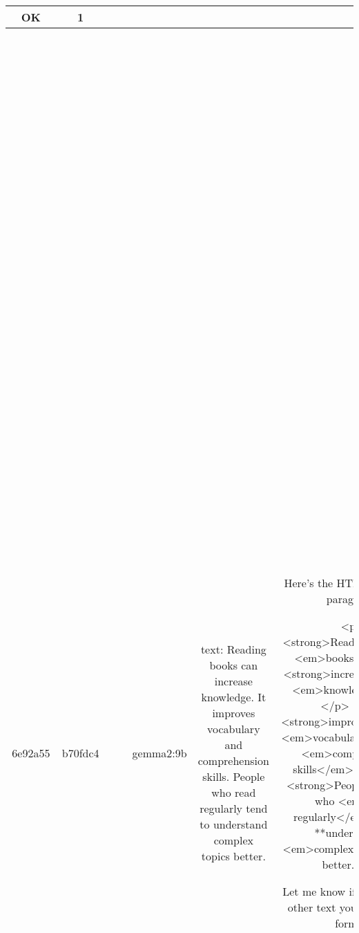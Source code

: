 \begin{table}[h!]
\begin{tabular}{|c|c|c|c|c|c|c|c|c|c|}
OK & 1\\
\hline
6e92a55 & b70fdc4 &  &  & gemma2:9b & text: Reading books can increase knowledge. It improves vocabulary and comprehension skills. People who read regularly tend to understand complex topics better. & Here's the HTML formatted paragraph:

<p><strong>Reading</strong> <em>books</em> can <strong>increase</strong> <em>knowledge</em>.</p>
<p>It <strong>improves</strong> <em>vocabulary</em> and <em>comprehension skills</em>.</p>
<p><strong>People</strong> who <em>read regularly</em> tend to **understand** <em>complex topics</em> better.</p>


Let me know if you have any other text you'd like me to format! & err & The chatbot output consists of three sentences, each wrapped in its own `<p>` tag, which complies with the requirement of having at least three `<p>` tags. 

1. The first `<p>` tag contains a `<strong>` tag emphasizing the word "Reading" and two `<em>` tags emphasizing "books" and "knowledge", which follows the instruction to use one `<strong>` tag and multiple `<em>` tags within each sentence.

2. The second `<p>` tag has a `<strong>` tag emphasizing "improves" and `<em>` tags for "vocabulary" and "comprehension skills."

3. The third `<p>` tag has a `<strong>` tag around "People," and although it intends to emphasize text with asterisks around "understand," it should have used a `<strong>` tag as required. It also contains `<em>` tags for "read regularly" and "complex topics."

The third sentence improperly uses asterisks for emphasis instead of an HTML `<strong>` tag, which breaches the requirement to use a `<strong>` tag. This discrepancy leads to non-compliance with the description provided.

ERR & 1\\
\hline
192d4b7 & b70fdc4 &  &  & gemma2:9b & text: Music has the power to change the mood. Different genres appeal to different emotions. Listening to music can be a therapeutic experience for many people. & <p><strong>Music</strong> has the power to <em>change</em> the <em>mood</em>.</p>
<p><strong>Different</strong> <em>genres</em> appeal to <em>different emotions</em>.</p>
<p><strong>Listening</strong> to <em>music</em> can be a <em>therapeutic experience</em> for <em>many people</em>.</p> 


Let me know if you'd like to experiment with emphasizing different words! & ok & The output consists of three <p> tags, each containing one <strong> tag and multiple <em> tags. This satisfies the requirement that the answer should have at least three <p> tags and that each <p> tag has one <strong> tag and multiple <em> tags to emphasize key words and phrases. There are no additional elements that contradict the description provided. Thus, the output complies with the requirements.


\end{tabular}
\end{table}
